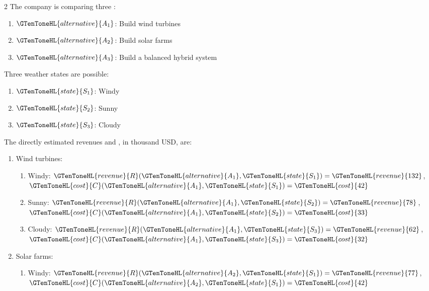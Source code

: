 \begin{multicols}{2}
	The company is comparing three :
	\begin{enumerate}[label=\arabic*.]
		\item \(\GTenToneHL{alternative}{A_1}\): Build wind turbines
		\item \(\GTenToneHL{alternative}{A_2}\): Build solar farms
		\item \(\GTenToneHL{alternative}{A_3}\): Build a balanced hybrid system
	\end{enumerate}
	
	Three weather states are possible:
	\begin{enumerate}[label=\arabic*.]
		\item \(\GTenToneHL{state}{S_1}\): Windy
		\item \(\GTenToneHL{state}{S_2}\): Sunny
		\item \(\GTenToneHL{state}{S_3}\): Cloudy
	\end{enumerate}
	
	\columnbreak
	
	The directly estimated revenues and , in thousand USD, are:
	\begin{enumerate}[label=\arabic*.]
		\item Wind turbines:
		\begin{enumerate}[label=\roman*)]
			\item Windy:
			\(\GTenToneHL{revenue}{R}(\GTenToneHL{alternative}{A_1},\GTenToneHL{state}{S_1})=\GTenToneHL{revenue}{132}\), \(\GTenToneHL{cost}{C}(\GTenToneHL{alternative}{A_1},\GTenToneHL{state}{S_1})=\GTenToneHL{cost}{42}\)
			
			\item Sunny:
			\(\GTenToneHL{revenue}{R}(\GTenToneHL{alternative}{A_1},\GTenToneHL{state}{S_2})=\GTenToneHL{revenue}{78}\), \(\GTenToneHL{cost}{C}(\GTenToneHL{alternative}{A_1},\GTenToneHL{state}{S_2})=\GTenToneHL{cost}{33}\)
			
			\item Cloudy:
			\(\GTenToneHL{revenue}{R}(\GTenToneHL{alternative}{A_1},\GTenToneHL{state}{S_3})=\GTenToneHL{revenue}{62}\), \(\GTenToneHL{cost}{C}(\GTenToneHL{alternative}{A_1},\GTenToneHL{state}{S_3})=\GTenToneHL{cost}{32}\)
		\end{enumerate}
		
		\item Solar farms:
		\begin{enumerate}[label=\roman*)]
			\item Windy:
			\(\GTenToneHL{revenue}{R}(\GTenToneHL{alternative}{A_2},\GTenToneHL{state}{S_1})=\GTenToneHL{revenue}{77}\), \(\GTenToneHL{cost}{C}(\GTenToneHL{alternative}{A_2},\GTenToneHL{state}{S_1})=\GTenToneHL{cost}{42}\)
			

\end{enumerate}
\end{enumerate}
\end{multicols}
